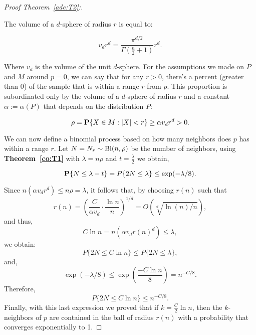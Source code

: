 \begin{proof}[Proof Theorem~\ref{ade:T2}:]\label{ade:T2P}

The volume of a $d$-sphere of radius $r$ is equal to:

\[ v_d r^d = \frac{\pi^{d/2}}{\Gamma(\tfrac{n}{2}+1)} r^d. \]

Where $v_d$ is the volume of the unit $d$-sphere. For the assumptions we made on $P$ and $M$ around $p = 0$, we can say that for any $r > 0$, there's a percent (greater than 0) of the sample that is within a range $r$ from $p$. This proportion is subordinated only by the volume of a $d$-sphere of radius $r$ and a constant $\alpha := \alpha(P)$ that depends on the distribution $P$:

\[ \rho = \P\{X \in M : |X| < r\} \geq \alpha v_d r^d  > 0.  \] 

We can now define a binomial process based on how many neighbors does $p$ has within a range $r$. Let $N = N_r \sim \Bi(n,\rho)$ be the number of neighbors, using \textbf{Theorem~\ref{co:T1}} with $\lambda = n\rho $ and $t = \tfrac{\lambda}{2}$ we obtain,

\[ \P\{N \leq \lambda - t\} = P\{2N \leq \lambda \} \leq \exp(-\lambda/8). \] 

Since $n(\alpha v_d r^d) \leq n\rho = \lambda$, it follows that, by choosing $r(n)$ such that 
\[ \tag*{($\star$)} r(n) = {\left(\frac{C}{\alpha v_d} \cdot \frac{\ln n}{n} \right)}^{1/d} = O(\sqrt[d]{\ln(n)/n}),\]
and thus,
\[ C \ln n = n(\alpha v_d r{(n)}^d) \leq \lambda,\]
we obtain:
\[P\{2N \leq C \ln n \} \leq P\{2N \leq \lambda \}, \]
and,
\[\exp(-\lambda/8)  \leq  \exp\left(\frac{-C\ln n}{8}\right) = n^{-C/8}.\]
Therefore,
\[P\{2N \leq C \ln n \} \leq  n^{-C/8}.\]
Finally, with this last expression we proved that if $k = \tfrac{C}{2}\ln n$, then the $k$-neighbors of $p$ are contained in the ball of radius $r(n)$ with a probability that converges exponentially to 1.
\end{proof}